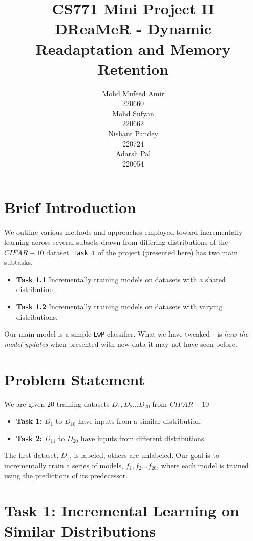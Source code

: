 \documentclass{article} %
\title{CS771 Mini Project II\\DReaMeR - Dynamic Readaptation and Memory Retention}
\author{
Mohd Mufeed Amir\\
220660\\
\And
Mohd Sufyan\\
220662\\
\AND
Nishant Pandey\\
220724\\
\And
Adarsh Pal\\
220054\\
}
\begin{document}
\setlength{\itemsep}{0pt}

\maketitle
\section{Brief Introduction}
We outline various methods and approaches employed toward incrementally learning across several subsets drawn from differing distributions of the $CIFAR-10$ dataset. \texttt{Task 1} of the project (presented here) has two main subtasks.
\begin{itemize}
    \item \textbf{Task 1.1} Incrementally training models on datasets with a shared distribution.
    \item \textbf{Task 1.2} Incrementally training models on datasets with varying distributions.
\end{itemize}
Our main model is a simple \texttt{LwP} classifier. What we have tweaked - is \textit{how the model updates} when presented with new data it may not have seen before.

\vspace{-5pt}
\section{Problem Statement}
We are given 20 training datasets $D_1, D_2 \dots D_{20}$ from $CIFAR-10$
\begin{itemize}
    \item \textbf{Task 1:} $D_1$ to $D_{10}$ have inputs from a similar distribution.
    \item \textbf{Task 2:} $D_{11}$ to $D_{20}$ have inputs from different distributions.
\end{itemize}
The first dataset, $D_1$, is labeled; others are unlabeled. Our goal is to incrementally train a series of models, $f_1, f_2 \dots f_{20}$, where each model is trained using the predictions of its predecessor. 

\section{Task 1: Incremental Learning on Similar Distributions}
\end{document}
